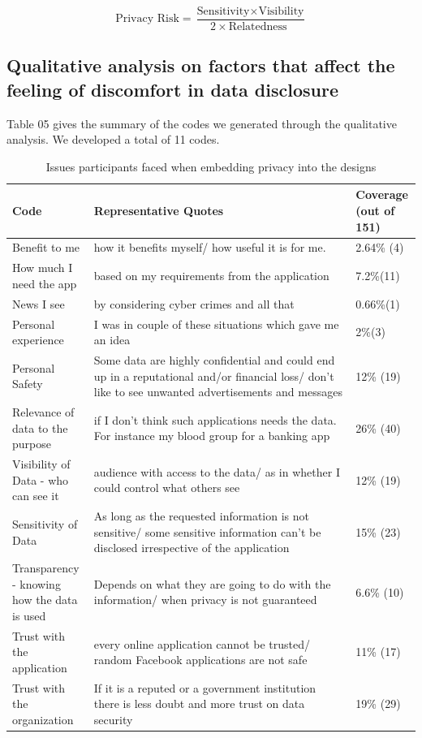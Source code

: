 \documentclass[conference]{IEEEtran}
\begin{document}
\[ \text{Privacy Risk}  =
\frac{
     \text{Sensitivity} \times \text{Visibility} }
 {
      2 \times  \text{Relatedness }}
\]

\subsection{Qualitative analysis on factors that affect the feeling of discomfort in data disclosure}

Table 05 gives the summary of the codes we generated through the qualitative analysis. We developed a total of 11 codes.

\begin{center}
\begin{table}[htbp]
\caption{Issues participants faced when embedding privacy into the designs}
\begin{center}
\begin{adjustbox}{width=1\textwidth}
\begin{tabular}{|p{0.20\linewidth}|p{0.64\linewidth}|p{0.16\linewidth}|}
\hline
Code &  Representative Quotes & Coverage (out of 151)\\
\hline
Benefit to me &how it benefits myself/ how useful it is for me. & 2.64\% (4)\\
\hline
How much I need the app &  based on my requirements from the application & 7.2\%(11)\\
\hline
News I see  & by considering cyber crimes and all that & 0.66\%(1) \\
\hline
Personal experience &  I was in couple of these situations which gave me an idea & 2\%(3) \\
\hline
Personal Safety & Some data are highly confidential and could end up in a reputational and/or financial loss/  don't like to see unwanted advertisements and messages & 12\% (19)\\ 
\hline
Relevance of data to the purpose &if I don't think such applications needs the data. For instance my blood group for a banking app
 & 26\% (40)\\ 
\hline
Visibility of Data - who can see it & audience with access to the data/ as in whether I could control what others see & 12\% (19)\\ 
\hline
Sensitivity of Data & As long as the requested information is not sensitive/  some sensitive information can't be disclosed irrespective of the application
 & 15\% (23)\\ 
\hline
Transparency - knowing how the data is used & Depends on what they are going to do with the information/ when privacy is not guaranteed & 6.6\% (10)\\ 
\hline
Trust with the application & every online application cannot be trusted/ random Facebook applications are not safe & 11\% (17)\\ 
\hline
Trust with the organization & If it is a reputed or a government institution there is less doubt and more trust on data security
 & 19\% (29)\\ 
\hline
\end{tabular}
\end{adjustbox}
\end{center}
\end{table}
\end{center}
\end{document}

